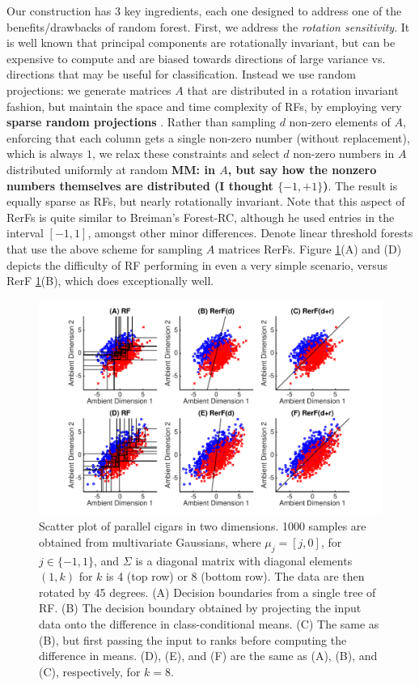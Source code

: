 \documentclass{article} %
\begin{document}
Our construction has $3$ key ingredients, each one designed to address one of the benefits/drawbacks of random forest.
First, we address the {\em{rotation sensitivity}}.  It is well known that principal components are rotationally invariant, but can be expensive to compute and are biased towards directions of large variance vs. directions that may be useful for classification. Instead we use random projections: we generate matrices $A$ that are distributed in a rotation invariant fashion, but maintain the space and time complexity of RFs, by employing very {\bf{sparse random projections}} \cite{Li2006}.  Rather than sampling $d$ non-zero elements of $A$, enforcing that each column gets a single non-zero number (without replacement), which is always $1$, we relax these constraints and select $d$ non-zero numbers in $A$ distributed uniformly at random {\bf{MM: in $A$, but say how the nonzero numbers themselves are distributed (I thought $\{-1,+1\}$)}}.  The result is equally sparse as RFs, but nearly rotationally invariant.  Note that this aspect of RerFs is quite similar to Breiman's Forest-RC, although he used entries in the interval $[-1,1]$, amongst other minor differences. Denote linear threshold forests that use the above scheme for sampling $A$ matrices RerFs.  Figure \ref{fig:cigars}(A) and (D) depicts the difficulty of RF performing in even a very simple scenario, versus RerF \ref{fig:cigars}(B), which does exceptionally well.


\begin{figure}[h]
\begin{center}
\includegraphics[trim=0in 0in 0in 0in, clip=true, width=\linewidth]{../Figures/pdf/Cigars}
\end{center}
\caption{Scatter plot of parallel cigars in two dimensions. 1000 samples are obtained from multivariate Gaussians, where $\mu_j=[j, 0]$, for $j \in \{-1,1\}$, and $\Sigma$ is a diagonal matrix with diagonal elements $(1,k)$ for $k$ is 4 (top row) or 8 (bottom row).  The data are then rotated by 45 degrees. (A) Decision boundaries from a single tree of RF. (B) The decision boundary obtained by projecting the input data onto the difference in class-conditional means. (C) The same as (B), but first passing the input to ranks before computing the difference in means. (D), (E), and (F) are the same as (A), (B), and (C), respectively, for $k=8$.}
\label{fig:cigars}
\end{figure}
\end{document}

